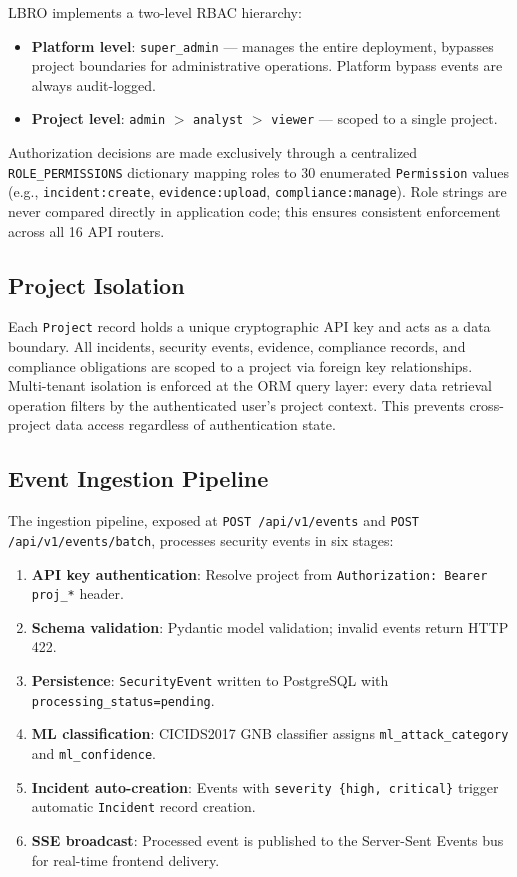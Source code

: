 \documentclass[conference]{IEEEtran}
\begin{document}
LBRO implements a two-level RBAC hierarchy:

\begin{itemize}
    \item \textbf{Platform level}: \texttt{super\_admin} — manages the entire deployment, bypasses project boundaries for administrative operations. Platform bypass events are always audit-logged.
    \item \textbf{Project level}: \texttt{admin} $>$ \texttt{analyst} $>$ \texttt{viewer} — scoped to a single project.
\end{itemize}

Authorization decisions are made exclusively through a centralized \texttt{ROLE\_PERMISSIONS} dictionary mapping roles to 30 enumerated \texttt{Permission} values (e.g., \texttt{incident:create}, \texttt{evidence:upload}, \texttt{compliance:manage}). Role strings are never compared directly in application code; this ensures consistent enforcement across all 16 API routers.

\subsection{Project Isolation}

Each \texttt{Project} record holds a unique cryptographic API key and acts as a data boundary. All incidents, security events, evidence, compliance records, and compliance obligations are scoped to a project via foreign key relationships. Multi-tenant isolation is enforced at the ORM query layer: every data retrieval operation filters by the authenticated user's project context. This prevents cross-project data access regardless of authentication state.

\subsection{Event Ingestion Pipeline}

The ingestion pipeline, exposed at \texttt{POST /api/v1/events} and \texttt{POST /api/v1/events/batch}, processes security events in six stages:

\begin{enumerate}
    \item \textbf{API key authentication}: Resolve project from \texttt{Authorization: Bearer proj\_*} header.
    \item \textbf{Schema validation}: Pydantic model validation; invalid events return HTTP 422.
    \item \textbf{Persistence}: \texttt{SecurityEvent} written to PostgreSQL with \texttt{processing\_status=pending}.
    \item \textbf{ML classification}: CICIDS2017 GNB classifier assigns \texttt{ml\_attack\_category} and \texttt{ml\_confidence}.
    \item \textbf{Incident auto-creation}: Events with \texttt{severity \in \{high, critical\}} trigger automatic \texttt{Incident} record creation.
    \item \textbf{SSE broadcast}: Processed event is published to the Server-Sent Events bus for real-time frontend delivery.
\end{enumerate}
\end{document}
